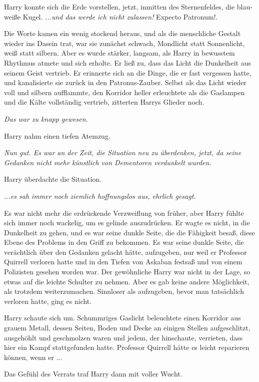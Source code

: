 Harry konnte sich die Erde vorstellen, jetzt, inmitten des Sternenfeldes, die
blau-weiße Kugel. \emph{...und das werde ich nicht zulassen!} \glqq{}Expecto
Patronum!\grqq{}.

Die Worte kamen ein wenig stockend heraus, und als die menschliche Gestalt
wieder ins Dasein trat, war sie zunächst schwach, Mondlicht statt Sonnenlicht,
weiß statt silbern. Aber es wurde stärker, langsam, als Harry in bewusstem
Rhythmus atmete und sich erholte. Er ließ zu, dass das Licht die Dunkelheit aus
seinem Geist vertrieb. Er erinnerte sich an die Dinge, die er fast vergessen
hatte, und kanalisierte sie zurück in den Patronus-Zauber. Selbst als das Licht
wieder voll und silbern aufflammte, den Korridor heller erleuchtete als die
Gaslampen und die Kälte vollständig vertrieb, zitterten Harrys Glieder noch.

\emph{Das war zu knapp gewesen.}

Harry nahm einen tiefen Atemzug.

\emph{Nun gut. Es war an der Zeit, die Situation neu zu überdenken, jetzt, da
seine Gedanken nicht mehr künstlich von Dementoren verdunkelt wurden.}

Harry überdachte die Situation.

\emph{...es sah immer noch ziemlich hoffnungslos aus, ehrlich gesagt}.

Es war nicht mehr die erdrückende Verzweiflung von früher, aber Harry fühlte
sich immer noch wackelig, um es gelinde auszudrücken. Er wagte es nicht, in die
Dunkelheit zu gehen, und es war seine dunkle Seite, die die Fähigkeit besaß,
diese Ebene des Problems in den Griff zu bekommen. Es war seine dunkle Seite,
die verächtlich über den Gedanken gelacht hätte, aufzugeben, nur weil er
Professor Quirrell verloren hatte und in den Tiefen von Askaban festsaß und von
einem Polizisten gesehen worden war. Der gewöhnliche Harry war nicht in der
Lage, so etwas auf die leichte Schulter zu nehmen. Aber es gab keine andere
Möglichkeit, als trotzdem weiterzumachen. Sinnloser als aufzugeben, bevor man
tatsächlich verloren hatte, ging es nicht.

Harry schaute sich um. Schummriges Gaslicht beleuchtete einen Korridor aus
grauem Metall, dessen Seiten, Boden und Decke an einigen Stellen aufgeschlitzt,
ausgehöhlt und geschmolzen waren und jedem, der hinschaute, verrieten, dass hier
ein Kampf stattgefunden hatte. Professor Quirrell hätte es leicht reparieren
können, wenn er ...

Das Gefühl des Verrats traf Harry dann mit voller Wucht.

